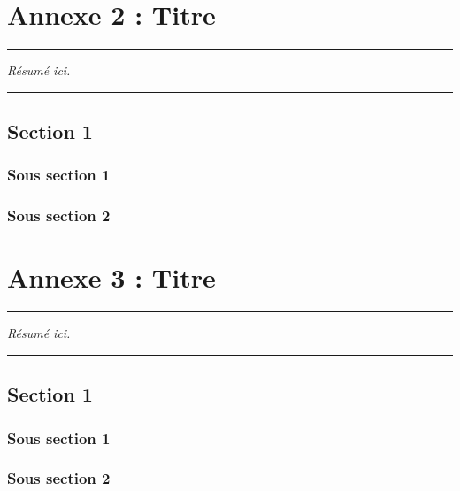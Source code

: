 \FloatBarrier
\chapter{Annexe 2 : Titre}
\label{Ann:2}


\begin{center}
	\rule{0.7\linewidth}{.5pt}
	\begin{minipage}{0.7\linewidth}
		\smallskip
		
		\textit{Résumé ici.
		}
		
	\end{minipage}
	\smallskip
	\rule{0.7\linewidth}{.5pt}
\end{center}

\minitoc
\newpage


\section{Section 1}
\subsection{Sous section 1}
\blindtext
\subsection{Sous section 2}
\blindtext



\FloatBarrier
\chapter{Annexe 3 : Titre}
\label{Ann:3}


\begin{center}
	\rule{0.7\linewidth}{.5pt}
	\begin{minipage}{0.7\linewidth}
		\smallskip
		
		\textit{Résumé ici.
		}
		
	\end{minipage}
	\smallskip
	\rule{0.7\linewidth}{.5pt}
\end{center}

\minitoc
\newpage

\section{Section 1}
\subsection{Sous section 1}
\blindtext
\subsection{Sous section 2}
\blindtext



